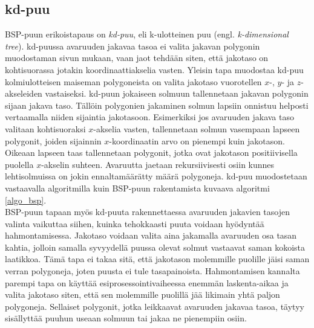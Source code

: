 \documentclass[a4paper, 12pt, titlepage]{article}
\begin{document}
\subsection{kd-puu}

BSP-puun erikoistapaus on \emph{kd-puu}, eli k-ulotteinen puu (engl. \emph{k-dimensional tree}). 
kd-puussa avaruuden jakavaa tasoa ei valita jakavan polygonin muodostaman sivun mukaan, vaan jaot tehdään siten, että jakotaso on kohtisuorassa  jotakin koordinaattiakselia vasten. Yleisin tapa muodostaa kd-puu kolmiulotteisen maiseman polygoneista on valita jakotaso vuorotellen $x$-, $y$- ja $z$-akseleiden vastaiseksi. kd-puun jokaiseen solmuun tallennetaan  
jakavan polygonin sijaan jakava taso. Tällöin polygonien jakaminen solmun lapsiin onnistuu helposti vertaamalla niiden sijaintia jakotasoon. Esimerkiksi jos avaruuden jakava taso valitaan kohtisuoraksi $x$-akselia vasten, tallennetaan solmun vasempaan lapseen polygonit, joiden sijainnin $x$-koordinaatin arvo on pienempi kuin jakotason. Oikeaan lapseen taas tallennetaan polygonit, jotka ovat jakotason positiivisella puolella $x$-akselin suhteen. \citep[.]{samet} Avaruutta jaetaan rekursiivisesti osiin kunnes lehtisolmuissa on jokin ennaltamäärätty määrä polygoneja. kd-puu muodostetaan vastaavalla algoritmilla kuin BSP-puun rakentamista kuvaava algoritmi \ref{algo_bsp}.\\

BSP-puun tapaan myös kd-puuta rakennettaessa avaruuden jakavien tasojen valinta vaikuttaa siihen, kuinka tehokkaasti puuta voidaan hyödyntää hahmontamisessa. Jakotaso voidaan valita aina jakamalla avaruuden osa tasan kahtia, jolloin samalla syvyydellä puussa olevat solmut vastaavat saman kokoista laatikkoa. Tämä tapa ei takaa sitä, että jakotason molemmille puolille jäisi saman verran polygoneja, joten puusta ei tule tasapainoista. Hahmontamisen kannalta parempi tapa on käyttää esiprosessointivaiheessa enemmän laskenta-aikaa ja valita jakotaso siten, että sen molemmille puolillä jää likimain yhtä paljon polygoneja. Sellaiset polygonit, jotka leikkaavat avaruuden jakavaa tasoa, täytyy sisällyttää puuhun useaan solmuun tai jakaa ne pienempiin osiin. \citep[.]{havran}\\
\end{document}
